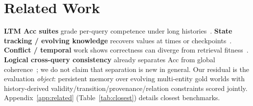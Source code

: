 \section{Related Work}
\label{sec:related}

\textbf{LTM Acc suites} grade per-query competence under long histories~\citep{wu2025longMemEval,wu2026longMemEvalV2,hu2025memoryAgentBench,hu2026everMemBench,wang2026evoMemBench}. \textbf{State tracking / evolving knowledge} recovers values at times or checkpoints~\citep{xie2026dynamicMem,liu2026worldMemArena}. \textbf{Conflict / temporal} work shows correctness can diverge from retrieval fitness~\citep{tao2026memConflict}. \textbf{Logical cross-query consistency} already separates Acc from global coherence~\citep{salla2026crossQueryContradictions,chaudhry2026logicVault}; we do not claim that separation is new in general. Our residual is the evaluation \emph{object}: persistent memory over evolving multi-entity gold worlds with history-derived validity/transition/provenance/relation constraints scored jointly. Appendix~\ref{app:related} (Table~\ref{tab:closest}) details closest benchmarks.

